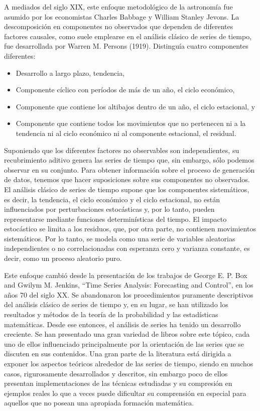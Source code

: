 \documentclass[12pt,]{krantz}
\theoremstyle{definition}
\theoremstyle{definition}
\theoremstyle{definition}
\theoremstyle{remark}
\begin{document}
A mediados del siglo XIX, este enfoque metodológico de la astronomía fue
asumido por los economistas Charles Babbage y William Stanley Jevons. La
descomposición en componentes no observados que dependen de diferentes
factores causales, como suele emplearse en el análisis clásico de series
de tiempo, fue desarrollada por Warren M. Persons (1919). Distinguía
cuatro componentes diferentes:

\begin{itemize}
\item
  Desarrollo a largo plazo, tendencia,
\item
  Componente cíclico con períodos de más de un año, el ciclo económico,
\item
  Componente que contiene los altibajos dentro de un año, el ciclo
  estacional, y
\item
  Componente que contiene todos los movimientos que no pertenecen ni a
  la tendencia ni al ciclo económico ni al componente estacional, el
  residual.
\end{itemize}

Suponiendo que los diferentes factores no observables son
independientes, su recubrimiento aditivo genera las series de tiempo
que, sin embargo, sólo podemos observar en su conjunto. Para obtener
información sobre el proceso de generación de datos, tenemos que hacer
suposiciones sobre sus componentes no observados. El análisis clásico de
series de tiempo supone que los componentes sistemáticos, es decir, la
tendencia, el ciclo económico y el ciclo estacional, no están
influenciados por perturbaciones estocásticas y, por lo tanto, pueden
representarse mediante funciones determinísticas del tiempo. El impacto
estocástico se limita a los residuos, que, por otra parte, no contienen
movimientos sistemáticos. Por lo tanto, se modela como una serie de
variables aleatorias independientes o no correlacionadas con esperanza
cero y varianza constante, es decir, como un proceso aleatorio puro.

Este enfoque cambió desde la presentación de los trabajos de George E.
P. Box and Gwilym M. Jenkins, ``Time Series Analysis: Forecasting and
Control'', en los años 70 del siglo XX. Se abandonaron los
procedimientos puramente descriptivos del análisis clásico de series de
tiempo y, en su lugar, se han utilizado los resultados y métodos de la
teoría de la probabilidad y las estadísticas matemáticas. Desde ese
entonces, el análisis de series ha tenido un desarrollo creciente. Se
han presentado una gran variedad de libros sobre este tópico, cada uno
de ellos influenciado principalmente por la orientación de las series
que se discuten en sus contenidos. Una gran parte de la literatura está
dirigida a exponer los aspectos teóricos alrededor de las series de
tiempo, siendo en muchos casos, rigurosamente desarrollados y descritos,
sin embargo poco de ellos presentan implementaciones de las técnicas
estudiadas y su compresión en ejemplos reales lo que a veces puede
dificultar su comprensión en especial para aquellos que no posean una
apropiada formación matemática.
\end{document}
